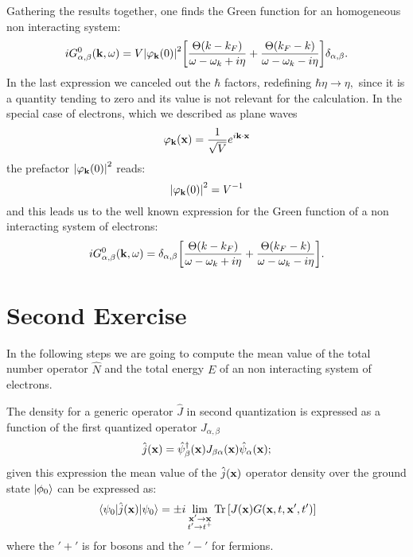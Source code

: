\documentclass[a4paper]{article}
\begin{document}
Gathering the results together, one finds the Green function for an homogeneous non interacting system:
\begin{equation}
iG_{\alpha,\beta}^0(\vb{k},\omega) =  V \abs{\varphi_{\vb{k}}(0) }^2  \bqty{\frac{\Theta\pqty{k-k_F}}{\omega - \omega_k + i\eta} + \frac{\Theta\pqty{k_F-k}}{\omega - \omega_k - i\eta}   } \delta_{\alpha,\beta}.
\end{equation}
In the last expression we canceled out the $\hbar$ factors, redefining $\hbar\eta\rightarrow\eta,$ since it is a quantity tending to zero and its value is not relevant for the calculation.
In the special case of electrons, which we described as plane waves
\begin{equation}
\varphi_{\vb{k}}(\vb{x}) = \frac{1}{\sqrt{V}}e^{i \vb{k}\cdot\vb{x}}
\end{equation}
the prefactor $\abs{\varphi_{\vb{k}}(0) }^2 $ reads:
\begin{equation}
\abs{\varphi_{\vb{k}}(0) }^2 = V^{-1}
\end{equation}
and this leads us to the well known expression for the Green function of a non interacting system of electrons:
\begin{equation}
iG_{\alpha,\beta}^0(\vb{k},\omega) = \delta_{\alpha,\beta} \bqty{\frac{\Theta\pqty{k-k_F}}{\omega - \omega_k + i\eta} + \frac{\Theta\pqty{k_F-k}}{\omega - \omega_k - i\eta}   } .
\end{equation}








\newpage
\section{Second Exercise}

\noindent In the following steps we are going to compute the mean value of the total number operator $\hat{N}$ and the total energy $E$ of an non interacting system of electrons.

The density for a generic operator $\hat{J} $ in second quantization is expressed as a function of the first quantized operator $J_{\alpha,\beta}$
\begin{equation}
\hat{j}(\vb{x}) = \hat{\psi}^\dag_\beta(\vb{x}) J_{\beta\alpha}(\vb{x})\hat{\psi}_\alpha(\vb{x});
\end{equation}
given this expression the mean value of the $\hat{j}(\vb{x})$ operator density over the ground state $\ket{\phi_0}$ can be expressed as:
\begin{equation}
\mel{\psi_0}{\hat{j}(\vb{x})}{\psi_0} = \pm i \lim_{\substack{\vb{x}'\rightarrow \vb{x}\\t'\rightarrow t^+}} \Tr\bqty{J(\vb{x})G(\vb{x},t,\vb{x}',t')} \label{eq:meanvalue}
\end{equation}
where the $'+'$ is for bosons and the $'-'$ for fermions.
\end{document}
